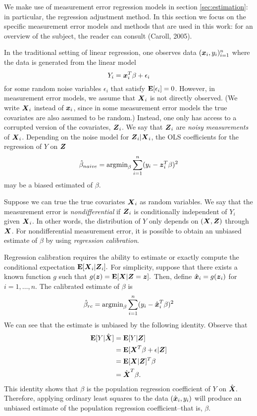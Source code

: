 \documentclass[12pt]{article}
\begin{document}
We make use of measurement error regression models in
section \ref{sec:estimation}: in particular, the regression adjustment
method.  In this section we focus on the specific measurement error
models and methods that are used in this work: for an overview of the
subject, the reader can consult (Caroll, 2005).

In the traditional setting of linear regression, one observes data
$(\boldsymbol{x}_i, y_i)_{i=1}^n$ where the data is generated from the linear model
\[
Y_i = \boldsymbol{x}_i^T \beta + \epsilon_i
\]
for some random noise variables $\epsilon_i$ that satisfy
$\textbf{E}[\epsilon_i] = 0$.  However, in measurement error models, we assume
that $\boldsymbol{X}_i$ is not directly observed.  (We write $\boldsymbol{X}_i$ instead of
$\boldsymbol{x}_i$, since in some measurement error models the true covariates
are also assumed to be random.)  Instead, one only has access to a
corrupted version of the covariates, $\boldsymbol{Z}_i$.  We say that $\boldsymbol{Z}_i$
are \emph{noisy measurements} of $\boldsymbol{X}_i$.  Depending on the noise
model for $\boldsymbol{Z}_i|\boldsymbol{X}_i$, the OLS coefficients for the regression of
$Y$ on $\boldsymbol{Z}$
\begin{equation}\label{eq:ols}
\hat{\beta}_{naive} = \text{argmin}_\beta \sum_{i=1}^n (y_i - \boldsymbol{z}_i^T \beta)^2
\end{equation}
may be a biased estimated of $\beta.$

Suppose we can true the true covariates $\boldsymbol{X}_i$ as random variables.
We say that the measurement error is \emph{nondifferential} if $\boldsymbol{Z}_i$
is conditionally independent of $Y_i$ given $\boldsymbol{X}_i$.  In other words,
the distribution of $Y$ only depends on $(\boldsymbol{X}, \boldsymbol{Z})$ through $\boldsymbol{X}$.
For nondifferential measurement error, it is possible to obtain an
unbiased estimate of $\beta$ by using \emph{regression calibration}.

Regression calibration requires the ability to estimate or exactly
compute the conditional expectation $\textbf{E}[\boldsymbol{X}_i|\boldsymbol{Z}_i].$ For simplicity,
suppose that there exists a known function $g$ such that $g(\boldsymbol{z})
= \textbf{E}[\boldsymbol{X}|\boldsymbol{Z} = \boldsymbol{z}].$ Then, define $\hat{\boldsymbol{x}}_i = g(\boldsymbol{z}_i)$ for $i =
1,\hdots, n$.  The calibrated estimate of $\beta$ is
\begin{equation}\label{eq:rc}
\hat{\beta}_{rc} = \text{argmin}_\beta \sum_{i=1}^n (y_i - \hat{\boldsymbol{x}}_i^T \beta)^2
\end{equation}
We can see that the estimate is unbiased by the following identity.
Observe that
\begin{align*}
\textbf{E}[Y|\hat{\boldsymbol{X}}] &= \textbf{E}[Y|\boldsymbol{Z}]
\\&= \textbf{E}[\boldsymbol{X}^T \beta + \epsilon|\boldsymbol{Z}]
\\&= \textbf{E}[\boldsymbol{X}|\boldsymbol{Z}]^T \beta
\\&= \hat{\boldsymbol{X}}^T \beta.
\end{align*}
This identity shows that $\beta$ is the population regression
coefficient of $Y$ on $\hat{\boldsymbol{X}}.$ Therefore, applying ordinary least
squares to the data $(\hat{\boldsymbol{x}}_i, y_i)$ will produce an unbiased
estimate of the population regression coefficient--that is, $\beta.$
\end{document}
